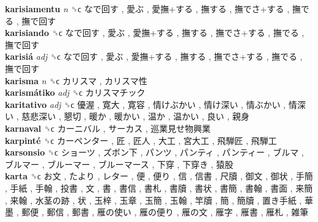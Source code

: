 \textbf{karisiamentu} \emph{n}  ␝ϲ   なで回す ,  愛ぶ ,  愛撫+する ,  撫する ,  撫でさ+する ,  撫でる ,  撫で回す   \\
\textbf{karisiando} ␝ϲ   なで回す ,  愛ぶ ,  愛撫+する ,  撫する ,  撫でさ+する ,  撫でる ,  撫で回す   \\
\textbf{karisiá} \emph{adj}  ␝ϲ   なで回す ,  愛ぶ ,  愛撫+する ,  撫する ,  撫でさ+する ,  撫でる ,  撫で回す   \\
\textbf{karisma} \emph{n}  ␝ϲ   カリスマ ,  カリスマ性   \\
\textbf{karismátiko} \emph{adj}  ␝ϲ   カリスマチック   \\
\textbf{karitativo} \emph{adj}  ␝ϲ   優渥 ,  寛大 ,  寛容 ,  情けぶかい ,  情け深い ,  情ぶかい ,  情深い ,  慈悲深い ,  懇切 ,  暖か ,  暖かい ,  温か ,  温かい ,  良い ,  親身   \\
\textbf{karnaval} ␝ϲ   カーニバル ,  サーカス ,  巡業見せ物興業   \\
\textbf{karpinté} ␝ϲ   カーペンター ,  匠 ,  匠人 ,  大工 ,  宮大工 ,  飛騨匠 ,  飛騨工   \\
\textbf{karsonsio} ␝ϲ   ショーツ ,  ズボン下 ,  パンツ ,  パンティ ,  パンティー ,  ブルマ ,  ブルマー ,  ブルーマー ,  ブルーマース ,  下穿 ,  下穿き ,  猿股   \\
\textbf{karta} ␝ϲ   お文 ,  たより ,  レター ,  便 ,  便り ,  信 ,  信書 ,  尺牘 ,  御文 ,  御状 ,  手簡 ,  手紙 ,  手翰 ,  投書 ,  文 ,  書 ,  書信 ,  書札 ,  書牘 ,  書状 ,  書簡 ,  書翰 ,  書面 ,  来簡 ,  来翰 ,  水茎の跡 ,  状 ,  玉梓 ,  玉章 ,  玉簡 ,  玉翰 ,  竿牘 ,  簡 ,  簡牘 ,  置き手紙 ,  華墨 ,  郵便 ,  郵信 ,  郵書 ,  雁の使い ,  雁の便り ,  雁の文 ,  雁字 ,  雁書 ,  雁札 ,  雑筆   \\
